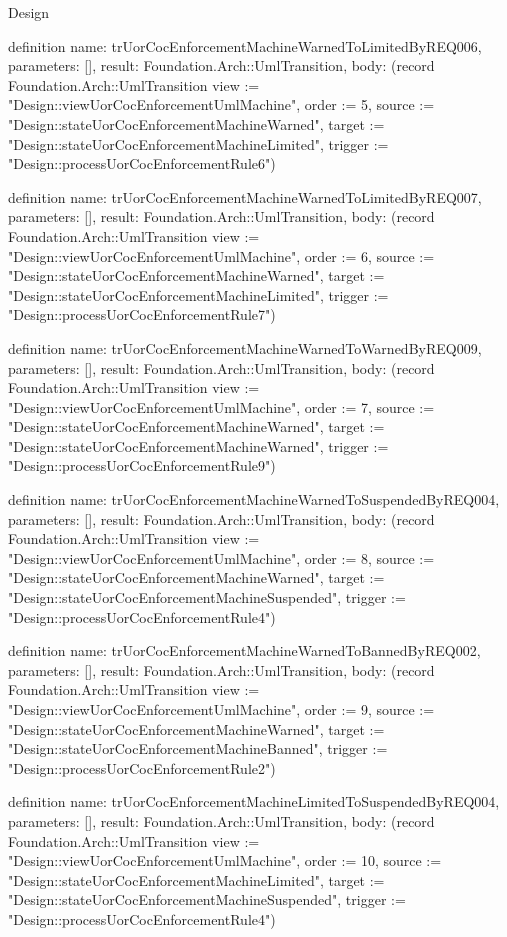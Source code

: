 \begin{lexlean}{Design}
\begin{semanticmodule}
definition{
  name: trUorCocEnforcementMachineWarnedToLimitedByREQ006,
  parameters: [],
  result: Foundation.Arch::UmlTransition,
  body: (record Foundation.Arch::UmlTransition {view := "Design::viewUorCocEnforcementUmlMachine", order := 5, source := "Design::stateUorCocEnforcementMachineWarned", target := "Design::stateUorCocEnforcementMachineLimited", trigger := "Design::processUorCocEnforcementRule6"})
}

definition{
  name: trUorCocEnforcementMachineWarnedToLimitedByREQ007,
  parameters: [],
  result: Foundation.Arch::UmlTransition,
  body: (record Foundation.Arch::UmlTransition {view := "Design::viewUorCocEnforcementUmlMachine", order := 6, source := "Design::stateUorCocEnforcementMachineWarned", target := "Design::stateUorCocEnforcementMachineLimited", trigger := "Design::processUorCocEnforcementRule7"})
}

definition{
  name: trUorCocEnforcementMachineWarnedToWarnedByREQ009,
  parameters: [],
  result: Foundation.Arch::UmlTransition,
  body: (record Foundation.Arch::UmlTransition {view := "Design::viewUorCocEnforcementUmlMachine", order := 7, source := "Design::stateUorCocEnforcementMachineWarned", target := "Design::stateUorCocEnforcementMachineWarned", trigger := "Design::processUorCocEnforcementRule9"})
}

definition{
  name: trUorCocEnforcementMachineWarnedToSuspendedByREQ004,
  parameters: [],
  result: Foundation.Arch::UmlTransition,
  body: (record Foundation.Arch::UmlTransition {view := "Design::viewUorCocEnforcementUmlMachine", order := 8, source := "Design::stateUorCocEnforcementMachineWarned", target := "Design::stateUorCocEnforcementMachineSuspended", trigger := "Design::processUorCocEnforcementRule4"})
}

definition{
  name: trUorCocEnforcementMachineWarnedToBannedByREQ002,
  parameters: [],
  result: Foundation.Arch::UmlTransition,
  body: (record Foundation.Arch::UmlTransition {view := "Design::viewUorCocEnforcementUmlMachine", order := 9, source := "Design::stateUorCocEnforcementMachineWarned", target := "Design::stateUorCocEnforcementMachineBanned", trigger := "Design::processUorCocEnforcementRule2"})
}

definition{
  name: trUorCocEnforcementMachineLimitedToSuspendedByREQ004,
  parameters: [],
  result: Foundation.Arch::UmlTransition,
  body: (record Foundation.Arch::UmlTransition {view := "Design::viewUorCocEnforcementUmlMachine", order := 10, source := "Design::stateUorCocEnforcementMachineLimited", target := "Design::stateUorCocEnforcementMachineSuspended", trigger := "Design::processUorCocEnforcementRule4"})
}


\end{semanticmodule}
\end{lexlean}
